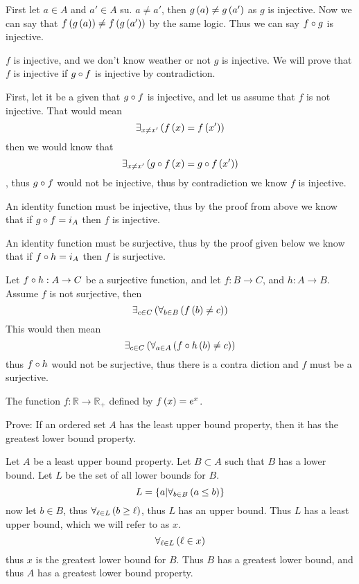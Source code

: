 \documentclass{article}
\begin{document}
First let $a \in A$ and $a' \in A$ su. $a\not=a'$, then $g \left( a \right) \not= g \left( a' \right)$ as $g$ is injective. Now we can say that $f \left( g \left( a \right) \right) \not= f \left( g \left( a' \right) \right)$ by the same logic. Thus we can say $f\circ g$ is injective.

 $f$ is injective, and we don't know weather or not $g$ is injective. We will prove that $f$ is injective if $g\circ f$ is injective by contradiction.

First, let it be a given that $g \circ f$ is injective, and let us assume that $f$ is not injective. That would mean \[\exists_{x\not=x'}\left( {f \left( x \right) = f \left( x' \right)} \right)\] then we would know that \[\exists_{x\not=x'}\left( {g\circ f \left( x \right) = g\circ f \left( x' \right)} \right)\], thus $g \circ f$ would not be injective, thus by contradiction we know $f$ is injective.

 An identity function must be injective, thus by the proof from above we know that if $g\circ f = i_A$ then $f$ is injective.

An identity function must be surjective, thus by the proof given below we know that if $f \circ h = i_A$ then $f$ is surjective.

Let $f\circ h: A \to C$ be a surjective function, and let $f: B\to C$, and $h:A\to B$. Assume $f$ is not surjective, then \[\exists_{c\in C}\left( {\forall_{b\in B}\left( f \left( b \right) \not= c \right)} \right)\] This would then mean \[\exists_{c \in C}\left( {\forall_{a \in A}\left( f \circ h \left( b \right) \not= c \right)} \right)\] thus $f \circ h$ would not be surjective, thus there is a contra diction and $f$ must be a surjective.

 The function $f:\mathbb R \to \mathbb R_+$ defined by $f \left( x \right) = e^x$.

 Prove: If an ordered set $A$ has the least upper bound property, then it has the greatest lower bound property.

Let $A$ be a least upper bound property. Let $B \subset A$ such that $B$ has a lower bound. Let $L$ be the set of all lower bounds for $B$.
\[L = \left\{ {a | \forall_{b\in B}\left( a\le b \right)} \right\}\]
now let $b\in B$, thus $\forall_{\ell \in L}\left( b \ge \ell \right)$, thus $L$ has an upper bound. Thus $L$ has a least upper bound, which we will refer to as $x$.
\[\forall_{\ell\in L}\left( \ell\in x \right)\]
thus $x$ is the greatest lower bound for $B$. Thus $B$ has a greatest lower bound, and thus $A$ has a greatest lower bound property.
\end{document}
